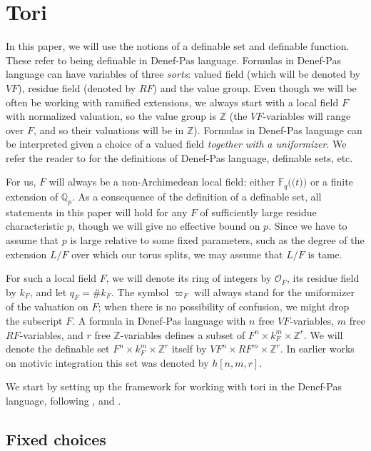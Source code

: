 \documentclass{amsart}
\newcommand{\Q}{{\mathbb Q}}
\newcommand{\F}{{\mathbb F}}
\newcommand{\Z}{{\mathbb Z}}
\newcommand{\ri}{\mathcal{O}}
\def\llp{\mathopen{(\!(}}
\def\rrp{\mathopen{)\!)}}
\theoremstyle{plain}
\theoremstyle{definition}
\begin{document}
\section{Tori} 
In this paper, we will use the notions of a definable set and  definable function. These refer to being definable in Denef-Pas language. 
Formulas in Denef-Pas language can have variables of three \emph{sorts}: valued field (which will be denoted by $VF$), residue field (denoted by $RF$) and the value group. Even though we will be often be working with ramified extensions, we always start with a local field $F$ with normalized valuation, so the value group is $\Z$ (the $VF$-variables will range over $F$, and so their valuations will be in $\Z$).
Formulas in Denef-Pas language can be interpreted given a choice of a valued field \emph{together with a uniformizer}. 
We refer the reader to \cite{what's the best ref?} for the definitions of Denef-Pas language, definable sets, etc. 

For us, $F$ will always be a non-Archimedean local field: either $\F_q\llp t\rrp$ or a finite extension of $\Q_p$.
As a consequence of the definition of a definable set, all statements in this paper will hold for any $F$ of sufficiently large residue characteristic $p$, 
though we will give no effective bound on $p$. Since we have to assume that $p$ is large relative to some fixed parameters, such as the degree of the extension $L/F$ over which our torus splits, we may assume that $L/F$ is tame.  

For such a local field $F$, we will denote its ring of integers by $\ri_F$, its residue field by $k_F$, and let $q_F=\# k_F$. The symbol $\varpi_F$ will always stand for the uniformizer of the valuation on $F$; when there is no possibility of confusion, we might drop the subscript $F$. 
A formula in Denef-Pas language  with $n$ free $VF$-variables, $m$ free $RF$-variables, and $r$ free 
$\Z$-variables 
defines a subset of $F^n\times k_F^m \times \Z^r$. 
We will denote the definable set $F^n\times k_F^m \times \Z^r$ itself by $VF^n\times RF^m\times \Z^r$. In earlier works on motivic integration this set was denoted by $h[n,m,r]$. 

We start by setting up the framework for working with tori in the Denef-Pas language, following \cite{cluckers-hales-loeser}, \cite{CGH-2} and \cite{hales:transfert}.

\subsection{Fixed choices}
\end{document}
